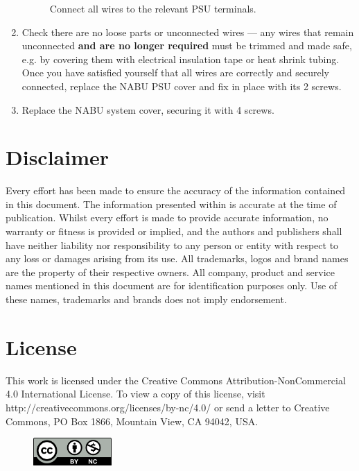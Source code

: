 \documentclass[twocolumn]{article}
\begin{document}
\begin{enumerate}
\begin{figure}[h!]
	    		\caption{Connect all wires to the relevant PSU terminals.}
	    		\label{fig:terminals}
	    	\end{figure}
    		\item Check there are no loose parts or unconnected wires --- any wires that remain unconnected \textbf{and are no longer required} must be trimmed and made safe, e.g. by covering them with electrical insulation tape or heat shrink tubing. Once you have satisfied yourself that all wires are correctly and securely connected, replace the NABU PSU cover and fix in place with its 2 screws.
    		\item Replace the NABU system cover, securing it with 4 screws.
	    \end{enumerate}
    \section*{Disclaimer}
    Every effort has been made to ensure the accuracy of the information contained in this document. The information presented within is accurate at the time of publication.  Whilst every effort is made to provide accurate information, no warranty or fitness is provided or implied, and the authors and publishers shall have neither liability nor responsibility to any person or entity with respect to any loss or damages arising from its use.
    All trademarks, logos and brand names are the property of their respective owners. All company, product and service names mentioned in this document are for identification purposes only. Use of these names, trademarks and brands does not imply endorsement.
    \section*{License}
    This work is licensed under the Creative Commons Attribution-NonCommercial 4.0 International License. To view a copy of this license, visit http://creativecommons.org/licenses/by-nc/4.0/ or send a letter to Creative Commons, PO Box 1866, Mountain View, CA 94042, USA.
   	\begin{figure}[h!]
    	\includegraphics[width=3cm]{images/by-nc.png}
    \end{figure}
\end{document}
